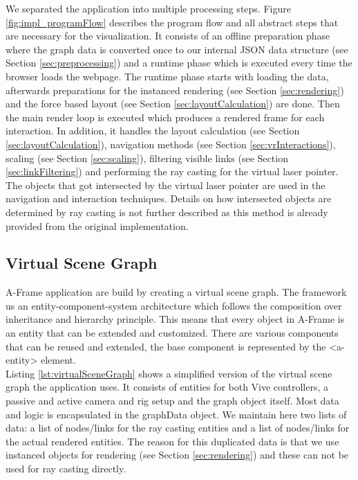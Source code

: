 We separated the application into multiple processing steps. Figure \ref{fig:impl_programFlow} describes the program flow and all abstract steps that are necessary for the visualization.
It consists of an offline preparation phase where the graph data is converted once to our internal JSON data structure (see Section \ref{sec:preprocessing}) and a runtime phase which is executed every time the browser loads the webpage.
The runtime phase starts with loading the data, afterwards preparations for the instanced rendering (see Section \ref{sec:rendering}) and the force based layout (see Section \ref{sec:layoutCalculation}) are done.
Then the main render loop is executed which produces a rendered frame for each interaction. In addition, it handles the layout calculation (see Section \ref{sec:layoutCalculation}), navigation methods (see Section \ref{sec:vrInteractions}), scaling (see Section \ref{sec:scaling}), filtering visible links (see Section \ref{sec:linkFiltering}) and performing the ray casting for the virtual laser pointer.
The objects that got intersected by the virtual laser pointer are used in the navigation and interaction techniques. 
Details on how intersected objects are determined by ray casting is not further described as this method is already provided from the original implementation. 

\subsection{Virtual Scene Graph}
A-Frame application are build by creating a virtual scene graph.
The framework us an entity-component-system architecture which follows the composition over inheritance and hierarchy principle. 
This means that every object in A-Frame is an entity that can be extended and customized.
There are various components that can be reused and extended, the base component is represented by the <a-entity> element.\\
Listing \ref{lst:virtualSceneGraph} shows a simplified version of the virtual scene graph the application uses. 
It consists of entities for both Vive controllers, a passive and active camera and rig setup and the graph object itself.
Most data and logic is encapsulated in the graphData object. We maintain here two lists of data: a list of nodes/links for the ray casting entities and a list of nodes/links for the actual rendered entities. 
The reason for this duplicated data is that we use  instanced objects for rendering (see Section \ref{sec:rendering}) and these can not be used for ray casting directly.

